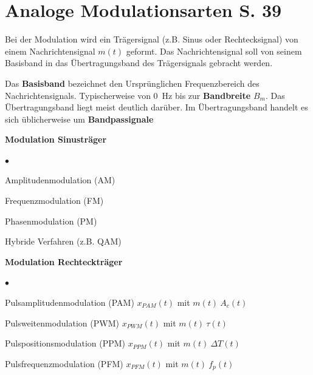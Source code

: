 \section{Analoge Modulationsarten S. 39}
Bei der Modulation wird ein Trägersignal (z.B. Sinus oder Rechtecksignal) von einem Nachrichtensignal $m(t)$ geformt. Das Nachrichtensignal soll von seinem Basisband in das Übertragungsband des Trägersignals gebracht werden.

Das \textbf{Basisband} bezeichnet den Ursprünglichen Frequenzbereich des Nachrichtensignals. Typischerweise von \qty{0}{\Hz} bis zur \textbf{Bandbreite} $B_m$. Das Übertragungsband liegt meist deutlich darüber. Im Übertragungsband handelt es sich üblicherweise um \textbf{Bandpassignale}

\begin{minipage}{.4\textwidth}
	\textbf{Modulation Sinusträger}
	
	\begin{list}{$\bullet$}{\setlength{\itemsep}{0cm} \setlength{\parsep}{0cm} \setlength{\topsep}{0cm}} 
	\item Amplitudenmodulation (AM)
	\item Frequenzmodulation (FM)
	\item Phasenmodulation (PM)
	\item Hybride Verfahren (z.B. QAM)
	\end{list}
\end{minipage}
\begin{minipage}{.6\textwidth}
	\textbf{Modulation Rechteckträger}
	
	\begin{list}{$\bullet$}{\setlength{\itemsep}{0cm} \setlength{\parsep}{0cm} \setlength{\topsep}{0cm}} 
		\item Pulsamplitudenmodulation (PAM) $x_{PAM}(t)$ mit $m(t)~A_c(t)$
		\item Pulsweitenmodulation (PWM) $x_{PWM}(t)$ mit $m(t) ~\tau(t)$
		\item Pulspositionsmodulation (PPM) $x_{PPM}(t)$ mit $m(t) ~ \Delta T(t)$
		\item Pulsfrequenzmodulation (PFM) $x_{PFM}(t)$ mit $m(t)~f_p(t)$
	\end{list}
\end{minipage}



\newpage